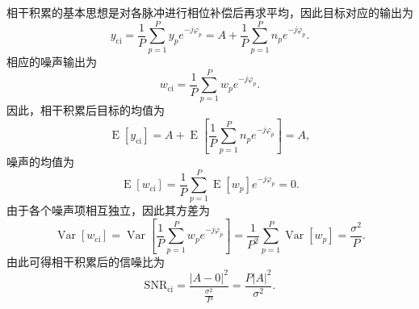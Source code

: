 相干积累的基本思想是对各脉冲进行相位补偿后再求平均，因此目标对应的输出为
\[
    y_{\mathrm{ci}} = \frac{1}{P} \sum_{p=1}^P y_p e^{-j \varphi_p} = A + \frac{1}{P} \sum_{p=1}^P n_p e^{-j \varphi_p}.
\]
相应的噪声输出为
\[
    w_{\mathrm{ci}} = \frac{1}{P} \sum_{p=1}^P w_p e^{-j \varphi_p}.
\]
因此，相干积累后目标的均值为
\[
    \operatorname{E}[y_{\mathrm{ci}}] = A + \operatorname{E}\left[ \frac{1}{P} \sum_{p=1}^P n_p e^{-j \varphi_p} \right] = A,
\]
噪声的均值为
\[
    \operatorname{E}[w_{\mathrm{ci}}] = \frac{1}{P} \sum_{p=1}^P \operatorname{E}[w_p] e^{-j \varphi_p} = 0.
\]
由于各个噪声项相互独立，因此其方差为
\[
    \operatorname{Var}[w_{\mathrm{ci}}] =\operatorname{Var}\left[\frac{1}{P}\sum_{p=1}^P w_p e^{-j \varphi_p} \right] = \frac{1}{P^2}\sum_{p=1}^P \operatorname{Var}[w_p] = \frac{\sigma^2}{P}.
\]
由此可得相干积累后的信噪比为
\[
    \mathrm{SNR}_{\mathrm{ci}} = \frac{|A - 0|^2}{\frac{\sigma^2}{P}} = \frac{P|A|^2}{\sigma^2}.
\]

